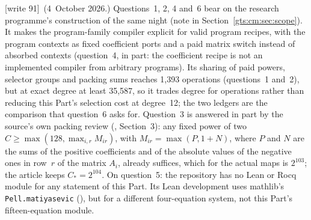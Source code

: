 \documentclass[11pt,letterpaper]{article}
\theoremstyle{definition}
\theoremstyle{remark}
\newcommand{\wtagd}{\textup{[write 91]}}
\begin{document}
\wtagd\ (4~October 2026.) Questions~1, 2, 4 and~6 bear on the research programme's construction of the same night (note in Section~\ref{gts:cm:sec:scope}). It makes the program-family compiler explicit for valid program recipes, with the program contexts as fixed coefficient ports and a paid matrix switch instead of absorbed contexts (question~4, in part: the coefficient recipe is not an implemented compiler from arbitrary programs). Its sharing of paid powers, selector groups and packing sums reaches 1,393 operations (questions~1 and~2), but at exact degree at least 35,587, so it trades degree for operations rather than reducing this Part's selection cost at degree~12; the two ledgers are the comparison that question~6 asks for. Question~3 is answered in part by the source's own packing review (, Section~3): any fixed power of two $C\geq\max(128,\max_{i,r}M_{ir})$, with $M_{ir}=\max(P,1+N)$, where $P$ and $N$ are the sums of the positive coefficients and of the absolute values of the negative ones in row~$r$ of the matrix $A_i$, already suffices, which for the actual maps is $2^{103}$; the article keeps $C_*=2^{104}$. On question~5: the repository has no Lean or Rocq module for any statement of this Part. Its Lean development uses mathlib's \texttt{Pell.matiyasevic} (), but for a different four-equation system, not this Part's fifteen-equation module.
\end{document}
